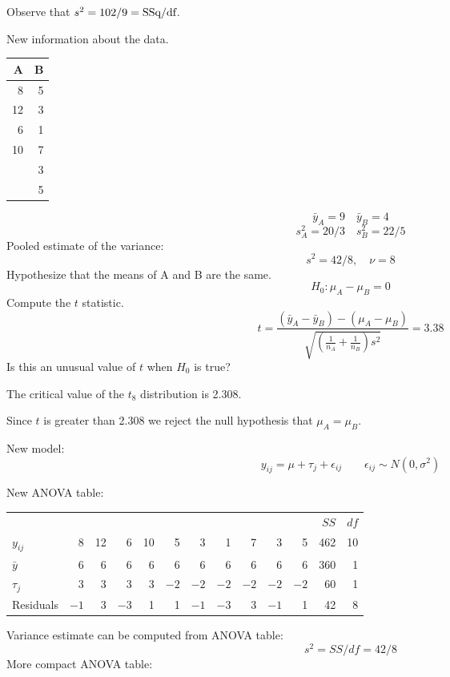 \documentclass[12pt]{article}
\begin{document}
Observe that $s^2=102/9=\hbox{SSq/df}$.

New information about the data.

\begin{center}
\begin{tabular}{|r|r|}
\hline
A & B\\
\hline
8 & 5\\
12 & 3\\
6 & 1\\
10 & 7\\
& 3\\
& 5\\
\hline
\end{tabular}
\end{center}
$$\bar y_A=9\quad\bar y_B=4$$
$$s^2_A=20/3\quad s^2_B=22/5$$
Pooled estimate of the variance:
$$s^2=42/8,\quad\nu=8$$
Hypothesize that the means of A and B are the same.
$$H_0:\mu_A-\mu_B=0$$
Compute the $t$ statistic.
$$t=\frac{(\bar y_A-\bar y_B)-(\mu_A-\mu_B)}
{\sqrt{\left(\frac{1}{n_A}+\frac{1}{n_B}\right)s^2}}
=3.38$$
Is this an unusual value of $t$ when $H_0$ is true?

The critical value of the $t_8$ distribution is 2.308.

Since $t$ is greater than 2.308 we reject the null hypothesis that $\mu_A=\mu_B$.

New model:
$$y_{ij}=\mu+\tau_j+\epsilon_{ij}\qquad\epsilon_{ij}\sim N(0,\sigma^2)$$

New ANOVA table:

\begin{center}
\begin{tabular}{|lrrrrrrrrrrrr|}
\hline
      &   &    &   &    &   &   &   &   &   &   & $SS$ & $df$\\
$y_{ij}$ & 8 & 12 & 6 & 10 & 5 & 3 & 1 & 7 & 3 & 5 & 462 & 10\\
$\bar y$ & 6 & 6 & 6 & 6 & 6 & 6 & 6 & 6 & 6 & 6 & 360 & 1\\
$\tau_j$ & 3 & 3 & 3 & 3 & $-2$ & $-2$ & $-2$ & $-2$ & $-2$ & $-2$ & 60 & 1\\
Residuals & $-1$ & 3 & $-3$ & 1 & 1 & $-1$ & $-3$ & 3 & $-1$ & 1 & 42 & 8\\
\hline
\end{tabular}
\end{center}

Variance estimate can be computed from ANOVA table:
$$s^2=SS/df=42/8$$
More compact ANOVA table:
\end{document}
